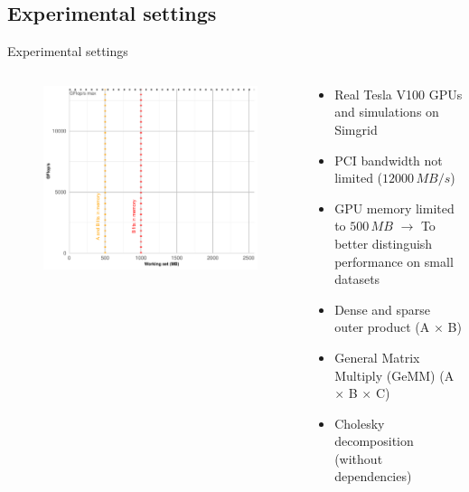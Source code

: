 \documentclass{libs/ufc_format}
\begin{document}
\subsection{Experimental settings}
\begin{frame}{Experimental settings}
    \begin{columns}{}
        \begin{column}{0.4\textwidth}
            \justify
            \begin{figure}
				\centering
				\includegraphics[scale=0.29]{Images/example_lines.pdf}
			\end{figure}

        \end{column}
        \begin{column}{0.6\textwidth}
        \begin{block}{}
            \begin{itemize}
				\item Real Tesla V100 GPUs and simulations on Simgrid
				\item PCI bandwidth not limited ($12000\,MB/s$)
				\item GPU memory limited to $500\,MB$ $\rightarrow$ To better distinguish performance on small datasets
			\end{itemize}
		\end{block}
			\begin{block}{}
			\begin{itemize}
				\item Dense and sparse outer product (A $\times$ B)
				\item General Matrix Multiply (GeMM) (A $\times$ B $\times$ C)
				\item Cholesky decomposition (without dependencies)
			\end{itemize}
			\end{block}
        \end{column}
    \end{columns}
\end{frame}
\end{document}
